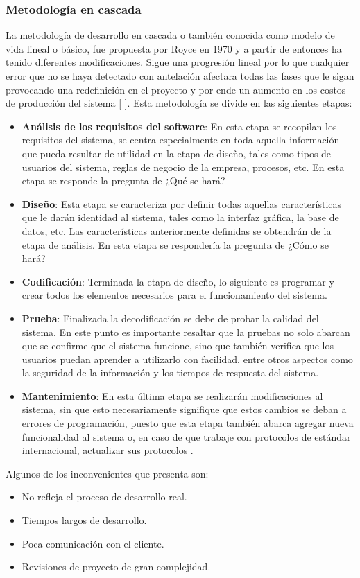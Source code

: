 	\subsubsection{Metodología en cascada}
La metodología de desarrollo en cascada o también conocida como modelo de vida lineal o básico,  fue propuesta por Royce en 1970 y a partir de entonces ha tenido diferentes modificaciones. Sigue una progresión lineal por lo que cualquier error que no se haya detectado con antelación afectara todas las fases que le sigan provocando una redefinición en el proyecto y por ende un aumento en los costos de producción del sistema [ ].
Esta metodología se divide en las siguientes etapas:
\begin{itemize}
	\item \textbf{Análisis de los requisitos del software}: En esta etapa se recopilan los requisitos del sistema, se centra especialmente en toda aquella información que pueda resultar de utilidad en la etapa de diseño, tales como tipos de usuarios del sistema, reglas de negocio de la empresa, procesos, etc. En esta etapa se responde la pregunta de ¿Qué se hará? 
	\item \textbf{Diseño}: Esta etapa se caracteriza por definir todas aquellas características que le darán identidad al sistema, tales como la interfaz gráfica, la base de datos, etc. Las características anteriormente definidas se obtendrán de la etapa de análisis. En esta etapa se respondería la pregunta de ¿Cómo se hará? 
	\item \textbf{Codificación}: Terminada la etapa de diseño, lo siguiente es programar y crear todos los elementos necesarios para el funcionamiento del sistema. 
	\item \textbf{Prueba}: Finalizada la decodificación se debe de probar la calidad del sistema. En este punto es importante resaltar que la pruebas no solo abarcan que se confirme que el sistema funcione, sino que también verifica que los usuarios puedan aprender a utilizarlo con facilidad, entre otros aspectos como la seguridad de la información y los tiempos de respuesta del sistema.
	\item \textbf{Mantenimiento}: En esta última etapa se realizarán modificaciones al sistema, sin que esto necesariamente signifique que estos cambios se deban a errores de programación, puesto que esta etapa también abarca agregar nueva funcionalidad al sistema o, en caso de que trabaje con protocolos de estándar internacional, actualizar sus protocolos \cite{Ref:CarCascada}. 
\end{itemize}
Algunos de los inconvenientes que presenta son:
\begin{itemize}
	\item No refleja el proceso de desarrollo real.
	\item Tiempos largos de desarrollo.
	\item Poca comunicación con el cliente.
	\item Revisiones de proyecto de gran complejidad.
\end{itemize}
